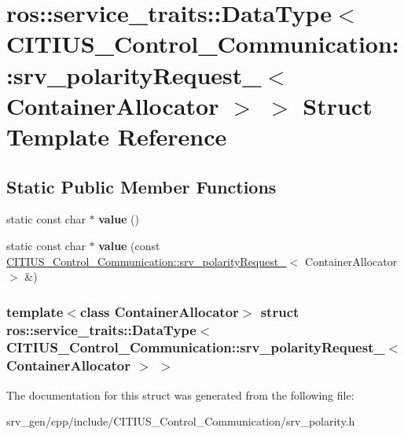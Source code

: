 \hypertarget{structros_1_1service__traits_1_1_data_type_3_01_c_i_t_i_u_s___control___communication_1_1srv__pof1c69974b09cb96e355ca6ec30a8db2d}{\section{ros\-:\-:service\-\_\-traits\-:\-:\-Data\-Type$<$ \-C\-I\-T\-I\-U\-S\-\_\-\-Control\-\_\-\-Communication\-:\-:srv\-\_\-polarity\-Request\-\_\-$<$ \-Container\-Allocator $>$ $>$ \-Struct \-Template \-Reference}
\label{structros_1_1service__traits_1_1_data_type_3_01_c_i_t_i_u_s___control___communication_1_1srv__pof1c69974b09cb96e355ca6ec30a8db2d}
}
\subsection*{\-Static \-Public \-Member \-Functions}
\begin{DoxyCompactItemize}
\item 
\hypertarget{structros_1_1service__traits_1_1_data_type_3_01_c_i_t_i_u_s___control___communication_1_1srv__pof1c69974b09cb96e355ca6ec30a8db2d_a2baa2305640f6522fbf2381a531a8ec8}{static const char $\ast$ {\bfseries value} ()}\label{structros_1_1service__traits_1_1_data_type_3_01_c_i_t_i_u_s___control___communication_1_1srv__pof1c69974b09cb96e355ca6ec30a8db2d_a2baa2305640f6522fbf2381a531a8ec8}

\item 
\hypertarget{structros_1_1service__traits_1_1_data_type_3_01_c_i_t_i_u_s___control___communication_1_1srv__pof1c69974b09cb96e355ca6ec30a8db2d_a8ea02930ca33b0e8c5a27dedc3e94af8}{static const char $\ast$ {\bfseries value} (const \hyperlink{struct_c_i_t_i_u_s___control___communication_1_1srv__polarity_request__}{\-C\-I\-T\-I\-U\-S\-\_\-\-Control\-\_\-\-Communication\-::srv\-\_\-polarity\-Request\-\_\-}$<$ \-Container\-Allocator $>$ \&)}\label{structros_1_1service__traits_1_1_data_type_3_01_c_i_t_i_u_s___control___communication_1_1srv__pof1c69974b09cb96e355ca6ec30a8db2d_a8ea02930ca33b0e8c5a27dedc3e94af8}

\end{DoxyCompactItemize}
\subsubsection*{template$<$class Container\-Allocator$>$ struct ros\-::service\-\_\-traits\-::\-Data\-Type$<$ C\-I\-T\-I\-U\-S\-\_\-\-Control\-\_\-\-Communication\-::srv\-\_\-polarity\-Request\-\_\-$<$ Container\-Allocator $>$ $>$}



\-The documentation for this struct was generated from the following file\-:\begin{DoxyCompactItemize}
\item 
srv\-\_\-gen/cpp/include/\-C\-I\-T\-I\-U\-S\-\_\-\-Control\-\_\-\-Communication/srv\-\_\-polarity.\-h\end{DoxyCompactItemize}
